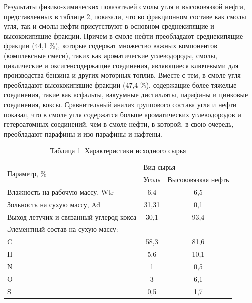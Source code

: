 \begin{multicols}{2}
Результаты физико-химических показателей смолы угля и высоковязкой
нефти, представленных в таблице 2, показали, что во фракционном составе
как смолы угля, так и смолы нефти присутствуют в основном среднекипящие
и высококипящие фракции. Причем в смоле нефти преобладают среднекипящие
фракции (44,1 \%), которые содержат множество важных компонентов
(комплексные смеси), таких как ароматические углеводороды, смолы,
циклические и оксигенсодержащие соединения, являющиеся ключевыми для
производства бензина и других моторных топлив. Вместе с тем, в смоле
угля преобладают высококипящие фракции (47,4 \%), содержащие более
тяжелые соединения, такие как асфальты, вакуумные дистилляты, парафины и
цинковые соединения, коксы. Сравнительный анализ группового состава угля
и нефти показал, что в смоле угля содержатся больше ароматических
углеводородов и гетероатомных соединений, чем в смоле нефти, в которой,
в свою очередь, преобладают парафины и изо-парафины и нафтены.
\end{multicols}

\begin{table}[H]
\caption*{Таблица 1 ̶ Характеристики исходного сырья}
\centering
\begin{tabular}{|l|cc|}
\hline
\multirow{2}{*}{Параметр, \%}           & \multicolumn{2}{l|}{Вид сырья}                                       \\ \cline{2-3} 
                                        & \multicolumn{1}{l|}{Уголь} & \multicolumn{1}{l|}{Высоковязкая нефть} \\ \hline
Влажность на рабочую массу, Wtr         & \multicolumn{1}{c|}{6,4}   & 6,5                                     \\ \hline
Зольность на сухую массу, Ad            & \multicolumn{1}{c|}{31,31} & 0,1                                     \\ \hline
Выход летучих и связанный углерод кокса & \multicolumn{1}{c|}{30,1}  & 93,4                                    \\ \hline
Элементный состав на сухую массу:       & \multicolumn{1}{c|}{}      & \multicolumn{1}{c|}{}                   \\ \hline
C                                       & \multicolumn{1}{c|}{58,3}  & 81,6                                    \\ \hline
H                                       & \multicolumn{1}{c|}{5,6}   & 10,1                                    \\ \hline
N                                       & \multicolumn{1}{c|}{1}     & 0,5                                     \\ \hline
O                                       & \multicolumn{1}{c|}{3}     & 6,1                                     \\ \hline
S                                       & \multicolumn{1}{c|}{0,5}   & 1,7                                     \\ \hline
\end{tabular}
\end{table}

